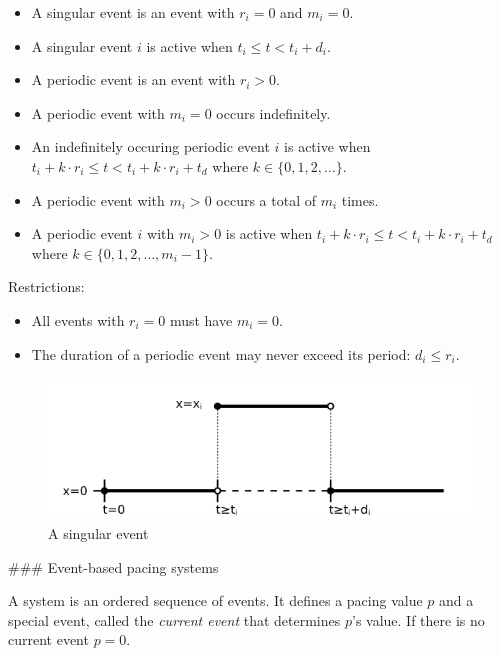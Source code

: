 \begin{itemize}
\item A singular event is an event with $r_i = 0$ and $m_i = 0$.
\item A singular event $i$ is active when $t_i \leq t < t_i + d_i$.
\item A periodic event is an event with $r_i > 0$.
\item A periodic event with $m_i = 0$ occurs indefinitely.
\item An indefinitely occuring periodic event $i$ is active when
 $ t_i + k \cdot r_i \leq t < t_i + k \cdot r_i + t_d$ where
 $k \in \{0,1,2,\ldots\}$.
\item A periodic event with $m_i > 0$ occurs a total of $m_i$ times.
\item A periodic event $i$ with $m_i > 0$ is active when
 $ t_i + k \cdot r_i \leq t < t_i + k \cdot r_i + t_d$ where
 $k \in \{0,1,2,\ldots,m_i-1\}$.
\end{itemize}

Restrictions:

\begin{itemize}
\item All events with $r_i = 0$ must have $m_i = 0$.
\item The duration of a periodic event may never exceed its period:
 $d_i \leq r_i$.
\end{itemize}

\begin{figure}[H]
\noindent
\begin{centering}
\includegraphics{figures/event}
\par
\end{centering}
\caption{A singular event}
\end{figure}

### Event-based pacing systems

A system is an ordered sequence of events.
It defines a pacing value $p$ and a special event, called the
 \emph{current event} that determines $p$'s value.
If there is no current event $p=0$.

